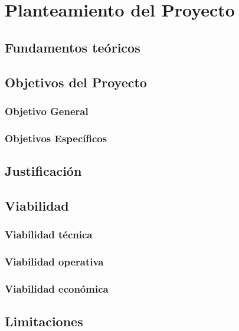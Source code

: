\chapter{Planteamiento del Proyecto}
\section{Fundamentos teóricos}

\section{Objetivos del Proyecto}
\subsection{Objetivo General}

\subsection{Objetivos Específicos}

\section{Justificación}

\section{Viabilidad}
\subsection{Viabilidad técnica}

\subsection{Viabilidad operativa}

\subsection{Viabilidad económica}

\section{Limitaciones}
